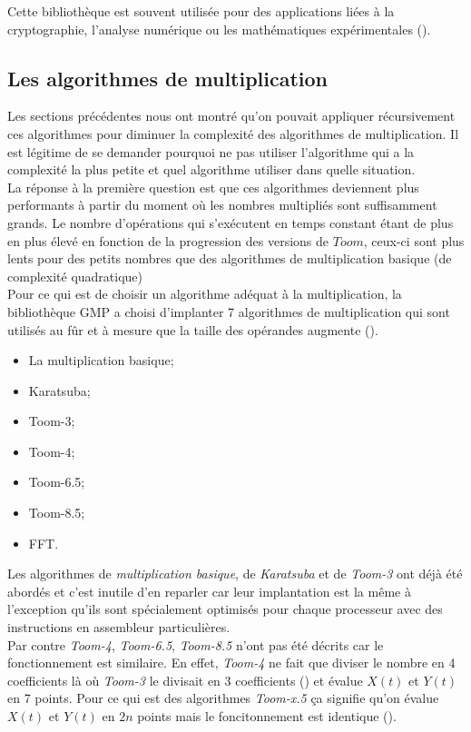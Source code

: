 \documentclass[letterpaper]{article}
\begin{document}
Cette bibliothèque est souvent utilisée pour des applications liées à la
cryptographie, l'analyse numérique ou les mathématiques expérimentales
(\cite{wikigmp}).

\subsection{Les algorithmes de multiplication}

Les sections précédentes nous ont montré qu'on pouvait appliquer récursivement
ces algorithmes pour diminuer la complexité des algorithmes de multiplication.
Il est légitime de se demander pourquoi ne pas utiliser l'algorithme
qui a la complexité la plus petite et quel algorithme utiliser dans
quelle situation.\\

La réponse à la première question est que ces algorithmes deviennent
plus performants à partir du moment où les nombres multipliés sont
suffisamment grands. Le nombre d'opérations qui s'exécutent en temps constant
étant de plus en plus élevé en fonction de la progression des versions de $Toom$,
ceux-ci sont plus lents pour des petits nombres que des algorithmes de
multiplication basique (de complexité quadratique)\\

Pour ce qui est de choisir un algorithme adéquat à la multiplication,
la bibliothèque GMP a choisi d'implanter 7 algorithmes de multiplication
qui sont utilisés au fûr et à mesure que la taille des opérandes
augmente (\cite{gmplibmultiplication}).

\begin{itemize}
  \item La multiplication basique;
  \item Karatsuba;
  \item Toom-3;
  \item Toom-4;
  \item Toom-6.5;
  \item Toom-8.5;
  \item FFT.
\end{itemize}

Les algorithmes de \emph{multiplication basique}, de \emph{Karatsuba} et de
\emph{Toom-3} ont déjà été abordés et c'est inutile d'en reparler car leur
implantation est la même à l'exception qu'ils sont spécialement optimisés pour
chaque processeur avec des instructions en assembleur particulières.\\

Par contre \emph{Toom-4}, \emph{Toom-6.5}, \emph{Toom-8.5} n'ont pas été
décrits car le fonctionnement est similaire. En effet, \emph{Toom-4} ne
fait que diviser le nombre en 4 coefficients là où \emph{Toom-3} le divisait en
3 coefficients (\cite{gmplibtoom4}) et évalue $X(t)$ et $Y(t)$ en 7 points.
Pour ce qui est des algorithmes \emph{Toom-x.5} ça signifie qu'on évalue $X(t)$
et $Y(t)$ en $2n$ points mais le foncitonnement est identique
(\cite{gmplibtoomhalf}).\\
\end{document}
